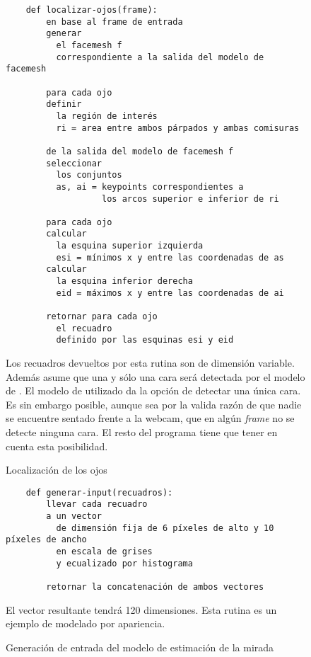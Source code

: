   \begin{figure}
    \centering
    \begin{verbatim}
    def localizar-ojos(frame):
        en base al frame de entrada
        generar
          el facemesh f
          correspondiente a la salida del modelo de facemesh

        para cada ojo
        definir
          la región de interés
          ri = area entre ambos párpados y ambas comisuras
        
        de la salida del modelo de facemesh f
        seleccionar
          los conjuntos
          as, ai = keypoints correspondientes a
                   los arcos superior e inferior de ri
        
        para cada ojo
        calcular
          la esquina superior izquierda
          esi = mínimos x y entre las coordenadas de as
        calcular
          la esquina inferior derecha
          eid = máximos x y entre las coordenadas de ai
      
        retornar para cada ojo
          el recuadro
          definido por las esquinas esi y eid\end{verbatim}
    Los recuadros devueltos por esta rutina son de dimensión variable. \\
    Además asume que una y sólo una cara será detectada por el modelo de
    \facemesh.
    El modelo de \tfjs utilizado da la opción de detectar una única cara.
    Es sin embargo posible, aunque sea por la valida razón de que nadie se
    encuentre sentado frente a la webcam, que en algún \textit{frame} no se
    detecte ninguna cara.
    El resto del programa tiene que tener en cuenta esta posibilidad.
    \caption{Localización de los ojos}
    \label{fig:eyes-localization}
  \end{figure}

  \begin{figure}
    \begin{verbatim}
    def generar-input(recuadros):
        llevar cada recuadro
        a un vector
          de dimensión fija de 6 píxeles de alto y 10 píxeles de ancho
          en escala de grises
          y ecualizado por histograma

        retornar la concatenación de ambos vectores\end{verbatim}
    El vector resultante tendrá 120 dimensiones.
    Esta rutina es un ejemplo de modelado por apariencia.
    \caption{Generación de entrada del modelo de estimación de la mirada}
    \label{fig:eye-features-to-model-input}
  \end{figure}

